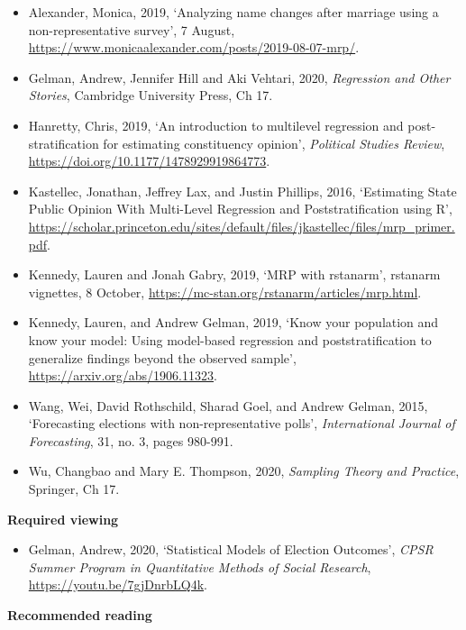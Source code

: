 \documentclass[
]{book}
\providecommand{\tightlist}{%
  \setlength{\itemsep}{0pt}\setlength{\parskip}{0pt}}
\begin{document}
\begin{itemize}
\tightlist
\item
  Alexander, Monica, 2019, `Analyzing name changes after marriage using a non-representative survey', 7 August, \url{https://www.monicaalexander.com/posts/2019-08-07-mrp/}.
\item
  Gelman, Andrew, Jennifer Hill and Aki Vehtari, 2020, \emph{Regression and Other Stories}, Cambridge University Press, Ch 17.
\item
  Hanretty, Chris, 2019, `An introduction to multilevel regression and post-stratification for estimating constituency opinion', \emph{Political Studies Review}, \url{https://doi.org/10.1177/1478929919864773}.
\item
  Kastellec, Jonathan, Jeffrey Lax, and Justin Phillips, 2016, `Estimating State Public Opinion With Multi-Level Regression and Poststratification using R', \url{https://scholar.princeton.edu/sites/default/files/jkastellec/files/mrp_primer.pdf}.
\item
  Kennedy, Lauren and Jonah Gabry, 2019, `MRP with rstanarm', rstanarm vignettes, 8 October, \url{https://mc-stan.org/rstanarm/articles/mrp.html}.
\item
  Kennedy, Lauren, and Andrew Gelman, 2019, `Know your population and know your model: Using model-based regression and poststratification to generalize findings beyond the observed sample', \url{https://arxiv.org/abs/1906.11323}.
\item
  Wang, Wei, David Rothschild, Sharad Goel, and Andrew Gelman, 2015, `Forecasting elections with non-representative polls', \emph{International Journal of Forecasting}, 31, no. 3, pages 980-991.
\item
  Wu, Changbao and Mary E. Thompson, 2020, \emph{Sampling Theory and Practice}, Springer, Ch 17.
\end{itemize}

\textbf{Required viewing}

\begin{itemize}
\tightlist
\item
  Gelman, Andrew, 2020, `Statistical Models of Election Outcomes', \emph{CPSR Summer Program in Quantitative Methods of Social Research}, \url{https://youtu.be/7gjDnrbLQ4k}.
\end{itemize}

\textbf{Recommended reading}
\end{document}

